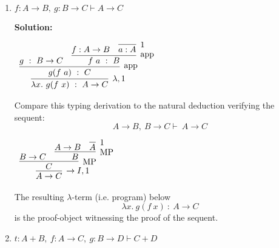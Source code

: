 \documentclass[11pt]{report}
\begin{document}
\begin{enumerate}
\begin{enumerate}
		\item $ f : A\rightarrow  B, \  g : B \rightarrow  C \vdash  A\rightarrow  C $
			
			{\bf Solution:}
				\begin{center}
					$\begin{array}{c}
						\infer[\lambda,1]{\lambda x. \ g(f \ x) \ : \ A \to C}
							{\infer[\app]{g(f \ a) \ : \ C}
								{g \ : \ B \to C
								&
								\infer[\app]{f \ a \ : \ B}
									{f : A \to B
									&
									\infer[1]{a : A}{}}}}
					\end{array}$
				\end{center}
			Compare this typing derivation to the natural deduction verifying the sequent: 
			$$A \rightarrow  B, \ B \rightarrow  C \vdash \ A \rightarrow  C $$
				\begin{center}
					$\begin{array}{c}
						\infer[\to I,1]{A \to C}
							{\infer[\MP]{C}
								{B \to C
								&
								\infer[\MP]{B}
									{A \to B
									&
									\infer[1]{A}{}}}}
					\end{array}$
				\end{center}
			The resulting $\lambda$-term (i.e. program) below
			$$ \lambda x. \ g(f \ x) \ : \ A \to C$$
			is the proof-object witnessing the proof of the sequent.
		
		\newpage
		\item $t : A +  B, \  f : A\to  C, \  g : B \to  D \vdash   C +  D$
			

\end{enumerate}
\end{enumerate}
\end{document}
